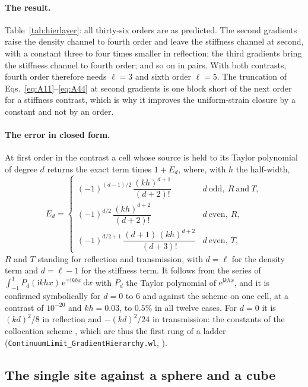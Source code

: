 \documentclass[11pt,a4paper]{article}
\newcommand{\nb}[1]{\texttt{#1}}
\newcommand{\dd}{\mathrm{d}}
\begin{document}
\paragraph{The result.} Table~\ref{tab:hierlayer}: all thirty-six orders are as predicted. The second
gradients raise the density channel to fourth order and leave the stiffness channel at second, with a
constant three to four times smaller in reflection; the third gradients bring the stiffness channel to fourth
order; and so on in pairs. With both contrasts, fourth order therefore needs $\ell=3$ and sixth order
$\ell=5$. The truncation of Eqs.~\eqref{eq:A11}--\eqref{eq:A44} at second gradients is one block short
of the next order for a stiffness contrast, which is why it improves the uniform-strain closure by a
constant and not by an order.

\paragraph{The error in closed form.} At first order in the contrast a cell whose source is held to
its Taylor polynomial of degree $d$ returns the exact term times $1+E_d$, where, with $h$ the
half-width,
\begin{equation}\label{eq:taylorfactor}
  E_d=\begin{cases}
  (-1)^{(d-1)/2}\,\dfrac{(kh)^{d+1}}{(d+2)!} & d\ \text{odd},\ R\ \text{and}\ T,\\[10pt]
  (-1)^{d/2}\,\dfrac{(kh)^{d+2}}{(d+2)!} & d\ \text{even},\ R,\\[10pt]
  (-1)^{d/2+1}\,\dfrac{(d+1)\,(kh)^{d+2}}{(d+3)!} & d\ \text{even},\ T,
  \end{cases}
\end{equation}
$R$ and $T$ standing for reflection and transmission,
with $d=\ell$ for the density term and $d=\ell-1$ for the stiffness term. It follows from the series of
$\int_{-1}^{1}P_d(\mathrm{i}khx)\,\mathrm{e}^{\mp\mathrm{i}khx}\,\dd x$ with $P_d$ the Taylor polynomial
of $\mathrm{e}^{\mathrm{i}khx}$, and it is confirmed symbolically for $d=0$ to $6$ and against the
scheme on one cell, at a contrast of $10^{-20}$ and $kh=0.03$, to $0.5\%$ in all twelve cases. For
$d=0$ it is $(kd)^2/8$ in reflection and $-(kd)^2/24$ in transmission: the constants of the collocation
scheme \citep{NestorError2026}, which are thus the first rung of a ladder
(\nb{ContinuumLimit\_GradientHierarchy.wl}, ).

\subsection{The single site against a sphere and a cube}\label{sec:singlesite}
\end{document}
